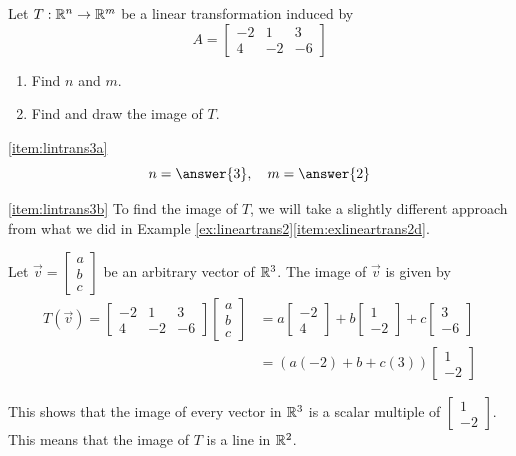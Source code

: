 \documentclass{ximera}
\begin{document}
\begin{example}\label{ex:lineartrans3}
Let $T:\mathbb{R}^n\rightarrow\mathbb{R}^m$ be a linear transformation induced by
$$A=\begin{bmatrix}
-2&1&3\\
4&-2&-6
\end{bmatrix}$$
\begin{enumerate}
\item\label{item:lintrans3a}
Find $n$ and $m$. 
\item\label{item:lintrans3b}
Find and draw the image of $T$.
\end{enumerate}
\begin{explanation}
\ref{item:lintrans3a} 
$$n=\answer{3}, \quad m=\answer{2}$$

\ref{item:lintrans3b} To find the image of $T$, we will take a slightly different approach from what we did in Example \ref{ex:lineartrans2}\ref{item:exlineartrans2d}.

Let $\vec{v}=\begin{bmatrix}a\\b\\c\end{bmatrix}$ be an arbitrary vector of $\mathbb{R}^3$.
The image of $\vec{v}$ is given by
\begin{align*}T(\vec{v})=\begin{bmatrix}
-2&1&3\\
4&-2&-6
\end{bmatrix}\begin{bmatrix}a\\b\\c\end{bmatrix}&=a\begin{bmatrix}-2\\4\end{bmatrix}+b\begin{bmatrix}1\\-2\end{bmatrix}+c\begin{bmatrix}3\\-6\end{bmatrix}\\
&=(a(-2)+b+c(3))\begin{bmatrix}1\\-2\end{bmatrix}
\end{align*}

This shows that the image of every vector in $\mathbb{R}^3$ is a scalar multiple of $\begin{bmatrix}1\\-2\end{bmatrix}$.  This means that the image of $T$ is a line in $\mathbb{R}^2$.


\end{explanation}
\end{example}
\end{document}
